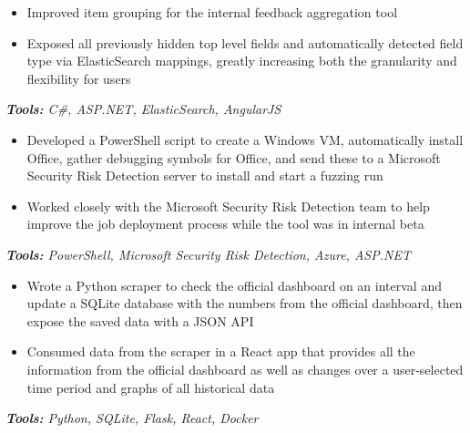 \documentclass[10pt,letter]{altacv}
\begin{document}

\begin{itemize}
\item Improved item grouping for the internal feedback aggregation tool
\item Exposed all previously hidden top level fields and automatically detected field type via ElasticSearch mappings, greatly increasing both the granularity and flexibility for users
\end{itemize}
\textit{\textbf{Tools:} C\#, ASP.NET, ElasticSearch, AngularJS}

\begin{itemize}
\item Developed a PowerShell script to create a Windows VM, automatically install Office, gather debugging symbols for Office, and send these to a Microsoft \\ Security Risk Detection server to install and start a fuzzing run
\item Worked closely with the Microsoft Security Risk Detection team to help improve the job deployment process while the tool was in internal beta
\end{itemize}
\textit{\textbf{Tools:} PowerShell, Microsoft Security Risk Detection, Azure, ASP.NET}

\smallskip



\begin{itemize}
\item Wrote a Python scraper to check the official dashboard on an interval and update a SQLite database with the numbers from the official dashboard, then expose the saved data with a JSON API
\item Consumed data from the scraper in a React app that provides all the information from the official dashboard as well as changes over a user-selected time period and graphs of all historical data
\end{itemize}
\textit{\textbf{Tools:} Python, SQLite, Flask, React, Docker}
\end{document}
